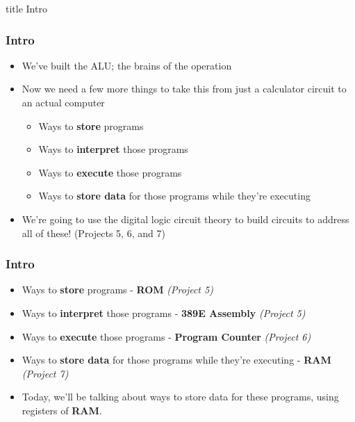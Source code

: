 \documentclass{beamer}
\begin{document}
    	\begin{frame}
                \vfill
                \centering
                \begin{beamercolorbox}[sep=8pt,center,shadow=true,rounded=true]{title}
                    Intro\par%
                \end{beamercolorbox}
                \vfill
             \end{frame}
    
    		\begin{frame}
    			\frametitle{Intro}
    			\begin{itemize}
    				\item We've built the ALU; the brains of the operation
    				\item Now we need a few more things to take this from just a calculator circuit to an actual computer
    				\begin{itemize}
    					\item Ways to \textbf{store} programs
    					\item Ways to \textbf{interpret} those programs
    					\item Ways to \textbf{execute} those programs
    					\item Ways to \textbf{store data} for those programs while they're executing
    				\end{itemize}
    				\item We're going to use the digital logic circuit theory to build circuits to address all of these! (Projects 5, 6, and 7)
    			\end{itemize}
    		\end{frame}
    		
    		\begin{frame}
    			\frametitle{Intro}
    			
    				\begin{itemize}
    					\item Ways to \textbf{store} programs - \textbf{ROM} \textit{(Project 5)}
    					\item Ways to \textbf{interpret} those programs - \textbf{389E Assembly} \textit{(Project 5)}
    					\item Ways to \textbf{execute} those programs - \textbf{Program Counter} \textit{(Project 6)}
    					\item Ways to \textbf{store data} for those programs while they're executing - \textbf{RAM} \textit{(Project 7)}
    					\item Today, we'll be talking about ways to store data for these programs, using registers of \textbf{RAM}.
    				\end{itemize}
    				
    			
    		\end{frame}
    		
\end{document}
